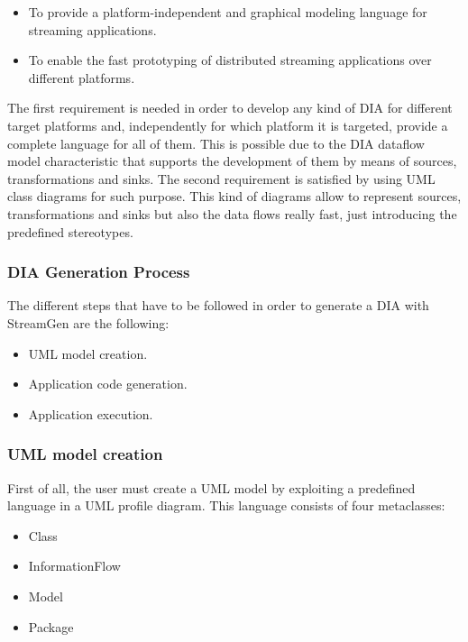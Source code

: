 \begin{itemize}
\item To provide a platform-independent and graphical modeling language for streaming applications.
\item To enable the fast prototyping of distributed streaming applications over different platforms.
\end{itemize}

The first requirement is needed in order to develop any kind of DIA for different target platforms and, independently for which platform it is targeted, provide a complete language for all of them. This is possible due to the DIA dataflow model characteristic that supports the development of them by means of sources, transformations and sinks. The second requirement is satisfied by using UML class diagrams for such purpose. This kind of diagrams allow to represent sources, transformations and sinks but also the data flows really fast, just introducing the predefined stereotypes.

\subsubsection{DIA Generation Process}

The different steps that have to be followed in order to generate a DIA with StreamGen are the following:

\begin{itemize}
\item UML model creation.
\item Application code generation.
\item Application execution.
\end{itemize}

\subsubsection*{UML model creation}

First of all, the user must create a UML model by exploiting a predefined language in a UML profile diagram. This language consists of four metaclasses:

\begin{itemize}
\item Class
\item InformationFlow
\item Model
\item Package
\end{itemize}

